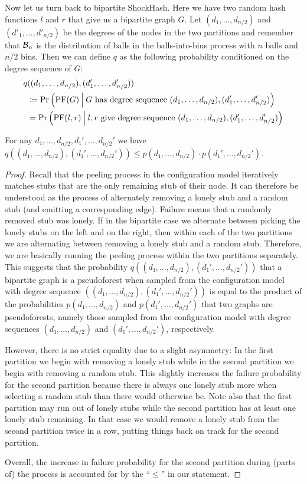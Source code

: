 \documentclass[a4paper,USenglish,cleveref]{lipics-v2021}
\def\cond{\hspace{0.8mm}\middle\vert\hspace{0.8mm}}
\begin{document}
Now let us turn back to bipartite ShockHash.
Here we have two random hash functions $l$ and $r$ that give us a bipartite graph $G$.
Let $(d_1, \ldots, d_{n/2})$ and $(d'_1, \ldots, d'_{n/2})$ be the degrees of the nodes in the two partitions and remember that $\mathcal{B}_n$ is the distribution of balls in the balls-into-bins process with $n$ balls and $n/2$ bins.
Then we can define $q$ as the following probability conditioned on the degree sequence of $G$:
\begin{align*}
  q&((d_1, \ldots, d_{n/2}), (d'_1, \ldots, d'_{n/2}))\\
    &\coloneqq \Pr\left(\PF(G) \cond G \textrm{ has degree sequence } (d_1, \ldots, d_{n/2}), (d'_1, \ldots, d'_{n/2}) \right) \\
    &= \Pr\left(\PF(l, r) \cond l,r \textrm{ give degree sequence } (d_1, \ldots, d_{n/2}), (d'_1, \ldots, d'_{n/2}) \right)
\end{align*}

\begin{lemma}
  For any $d₁,…,d_{n/2},d₁',…,d_{n/2}'$ we have $q((d₁,…,d_{n/2}),(d₁',…,d_{n/2}')) ≤ p(d₁,…,d_{n/2})·p(d₁',…,d_{n/2}')$.
  \label{lem:peelingSeparate}
\end{lemma}
\begin{proof}
  Recall that the peeling process in the configuration model iteratively matches stubs that are the only remaining stub of their node.
  It can therefore be understood as the process of alternately removing a lonely stub and a random stub (and emitting a corresponding edge).
  Failure means that a randomly removed stub was lonely.
  If in the bipartite case we alternate between picking the lonely stubs on the left and on the right, then within each of the two partitions we are alternating between removing a lonely stub and a random stub.
  Therefore, we are basically running the peeling process within the two partitions separately.
  This suggests that the probability $q((d₁,…,d_{n/2}),(d₁',…,d_{n/2}'))$ that a bipartite graph is a pseudoforest when sampled from the configuration model with degree sequence $((d₁,…,d_{n/2}),(d₁',…,d_{n/2}'))$ is equal to the product of the probabilities $p(d₁,…,d_{n/2})$ and $p(d₁',…,d_{n/2}')$ that two graphs are pseudoforests, namely those sampled from the configuration model with degree sequences $(d₁,…,d_{n/2})$ and $(d₁',…,d_{n/2}')$, respectively.

  However, there is no strict equality due to a slight asymmetry:
  In the first partition we begin with removing a lonely stub while in the second partition we begin with removing a random stub.
  This slightly increases the failure probability for the second partition because there is always one lonely stub more when selecting a random stub than there would otherwise be.
  Note also that the first partition may run out of lonely stubs while the second partition has at least one lonely stub remaining.
  In that case we would remove a lonely stub from the second partition twice in a row, putting things back on track for the second partition.

  Overall, the increase in failure probability for the second partition during (parts of) the process is accounted for by the “$≤$” in our statement.  
\end{proof}
\end{document}
